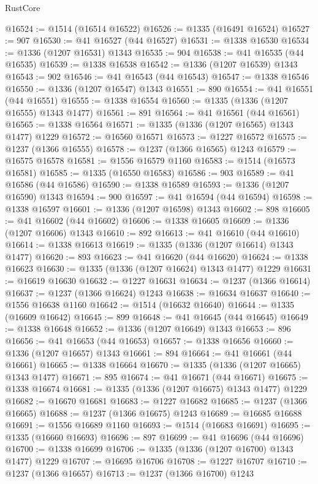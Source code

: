 \begin{lexlean}{RustCore}
\begin{coremodule}
@16524 := @1514 (@16514 @16522)
@16526 := @1335 (@16491 @16524)
@16527 := 907
@16530 := @41 @16527 (@44 @16527)
@16531 := @1338 @16530
@16534 := @1336 (@1207 @16531) @1343
@16535 := 904
@16538 := @41 @16535 (@44 @16535)
@16539 := @1338 @16538
@16542 := @1336 (@1207 @16539) @1343
@16543 := 902
@16546 := @41 @16543 (@44 @16543)
@16547 := @1338 @16546
@16550 := @1336 (@1207 @16547) @1343
@16551 := 890
@16554 := @41 @16551 (@44 @16551)
@16555 := @1338 @16554
@16560 := @1335 (@1336 (@1207 @16555) @1343 @1477)
@16561 := 891
@16564 := @41 @16561 (@44 @16561)
@16565 := @1338 @16564
@16571 := @1335 (@1336 (@1207 @16565) @1343 @1477) @1229
@16572 := @16560 @16571
@16573 := @1227 @16572
@16575 := @1237 (@1366 @16555)
@16578 := @1237 (@1366 @16565) @1243
@16579 := @16575 @16578
@16581 := @1556 @16579 @1160
@16583 := @1514 (@16573 @16581)
@16585 := @1335 (@16550 @16583)
@16586 := 903
@16589 := @41 @16586 (@44 @16586)
@16590 := @1338 @16589
@16593 := @1336 (@1207 @16590) @1343
@16594 := 900
@16597 := @41 @16594 (@44 @16594)
@16598 := @1338 @16597
@16601 := @1336 (@1207 @16598) @1343
@16602 := 898
@16605 := @41 @16602 (@44 @16602)
@16606 := @1338 @16605
@16609 := @1336 (@1207 @16606) @1343
@16610 := 892
@16613 := @41 @16610 (@44 @16610)
@16614 := @1338 @16613
@16619 := @1335 (@1336 (@1207 @16614) @1343 @1477)
@16620 := 893
@16623 := @41 @16620 (@44 @16620)
@16624 := @1338 @16623
@16630 := @1335 (@1336 (@1207 @16624) @1343 @1477) @1229
@16631 := @16619 @16630
@16632 := @1227 @16631
@16634 := @1237 (@1366 @16614)
@16637 := @1237 (@1366 @16624) @1243
@16638 := @16634 @16637
@16640 := @1556 @16638 @1160
@16642 := @1514 (@16632 @16640)
@16644 := @1335 (@16609 @16642)
@16645 := 899
@16648 := @41 @16645 (@44 @16645)
@16649 := @1338 @16648
@16652 := @1336 (@1207 @16649) @1343
@16653 := 896
@16656 := @41 @16653 (@44 @16653)
@16657 := @1338 @16656
@16660 := @1336 (@1207 @16657) @1343
@16661 := 894
@16664 := @41 @16661 (@44 @16661)
@16665 := @1338 @16664
@16670 := @1335 (@1336 (@1207 @16665) @1343 @1477)
@16671 := 895
@16674 := @41 @16671 (@44 @16671)
@16675 := @1338 @16674
@16681 := @1335 (@1336 (@1207 @16675) @1343 @1477) @1229
@16682 := @16670 @16681
@16683 := @1227 @16682
@16685 := @1237 (@1366 @16665)
@16688 := @1237 (@1366 @16675) @1243
@16689 := @16685 @16688
@16691 := @1556 @16689 @1160
@16693 := @1514 (@16683 @16691)
@16695 := @1335 (@16660 @16693)
@16696 := 897
@16699 := @41 @16696 (@44 @16696)
@16700 := @1338 @16699
@16706 := @1335 (@1336 (@1207 @16700) @1343 @1477) @1229
@16707 := @16695 @16706
@16708 := @1227 @16707
@16710 := @1237 (@1366 @16657)
@16713 := @1237 (@1366 @16700) @1243

\end{coremodule}
\end{lexlean}
